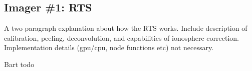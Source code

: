 \subsection{Imager \#1: RTS}
A two paragraph explanation about how the RTS works. Include description of calibration, peeling, deconvolution, and capabilities of ionosphere correction. Implementation details (gpu/cpu, node functions etc) not necessary.

Bart todo